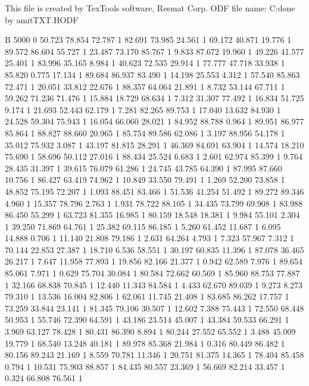 This file is created by TexTools software, Resmat Corp.
ODF file name: C:\Users\Intel\Desktop\Texture done by amit\Sol TXT\solodf.HODF

B 5000 0
	50.723	78.854	72.787	1
	82.691	73.985	24.561	1
	69.172	40.871	19.776	1
	89.572	86.604	55.727	1
	23.487	73.170	85.767	1
	9.833	87.672	19.960	1
	49.226	41.577	25.401	1
	83.996	35.165	8.984	1
	40.623	72.535	29.914	1
	77.777	47.718	33.938	1
	85.820	0.775	17.134	1
	89.684	86.937	83.490	1
	14.198	25.553	4.312	1
	57.540	85.863	72.471	1
	20.051	33.812	22.676	1
	88.357	64.064	21.891	1
	8.732	53.144	67.711	1
	59.262	71.236	71.476	1
	15.884	18.729	68.634	1
	7.312	31.307	77.492	1
	16.834	51.725	9.174	1
	21.693	52.443	62.179	1
	7.281	82.265	89.753	1
	17.040	13.632	84.930	1
	24.528	59.304	75.943	1
	16.054	66.060	28.021	1
	84.952	88.788	0.964	1
	89.951	86.977	85.864	1
	88.827	88.660	20.965	1
	85.754	89.586	62.086	1
	3.197	88.956	54.178	1
	35.012	75.932	3.087	1
	43.197	81.815	28.291	1
	46.369	84.691	63.904	1
	14.574	18.210	75.690	1
	58.696	50.112	27.016	1
	88.434	25.524	6.683	1
	2.601	62.974	85.399	1
	9.764	28.435	31.397	1
	39.615	76.079	61.286	1
	24.745	43.785	64.390	1
	87.995	87.660	10.756	1
	86.427	63.419	74.962	1
	10.849	33.550	79.491	1
	1.269	52.200	73.858	1
	48.852	75.195	72.207	1
	1.093	88.451	83.466	1
	51.536	41.254	51.492	1
	89.272	89.346	4.960	1
	15.357	78.796	2.763	1
	1.931	78.722	88.105	1
	34.435	73.799	69.908	1
	83.988	86.450	55.299	1
	63.723	81.355	16.985	1
	80.159	18.548	18.381	1
	9.984	55.101	2.304	1
	39.250	71.869	64.761	1
	25.382	69.115	86.185	1
	5.260	61.452	11.687	1
	6.095	14.888	0.706	1
	11.140	21.808	79.186	1
	2.631	64.264	4.793	1
	7.323	57.967	7.312	1
	70.144	22.853	27.387	1
	18.710	6.536	58.551	1
	30.197	60.835	11.396	1
	87.078	36.465	26.217	1
	7.647	11.958	77.893	1
	19.856	82.166	21.377	1
	0.942	62.589	7.976	1
	89.654	85.061	7.971	1
	0.629	75.704	30.084	1
	80.584	72.662	60.569	1
	85.960	88.753	77.887	1
	32.166	68.838	70.845	1
	12.440	11.343	84.584	1
	4.433	62.670	89.039	1
	9.273	8.273	79.310	1
	13.536	16.004	82.806	1
	62.061	11.745	21.408	1
	83.685	86.262	17.757	1
	73.259	33.844	23.141	1
	81.345	79.106	30.507	1
	12.602	7.388	75.443	1
	72.550	68.448	50.953	1
	55.746	72.390	64.591	1
	43.186	23.514	45.007	1
	43.384	59.533	66.291	1
	3.969	63.127	78.428	1
	80.431	86.390	8.894	1
	80.244	27.552	65.552	1
	3.488	45.009	19.779	1
	68.540	13.248	40.181	1
	89.978	85.368	21.984	1
	0.316	80.449	86.482	1
	80.156	89.243	21.169	1
	8.559	70.781	11.346	1
	20.751	81.375	14.365	1
	78.404	85.458	0.794	1
	10.531	75.903	88.857	1
	84.435	80.557	23.369	1
	56.669	82.214	33.457	1
	0.324	66.808	76.561	1
